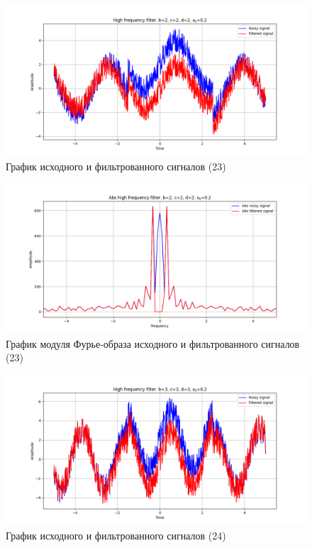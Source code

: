 \documentclass[a4paper, 12pt]{article}
\begin{document}
    \begin{figure}[!htb]
        \centering
        \includegraphics[scale=0.48]{23_u_flt_u_nolow.png}
        \captionsetup{skip=0pt}
        \caption{График исходного и фильтрованного сигналов (23)}
        \label{fig:fig_c}
    \end{figure}
    \begin{figure}[!htb]
        \centering
        \includegraphics[scale=0.48]{23_abs_u_U_nolow.png}
        \captionsetup{skip=0pt}
        \caption{График модуля Фурье-образа исходного и фильтрованного сигналов (23)}
        \label{fig:fig_d}
    \end{figure}
    \begin{figure}[!htb]
        \centering
        \includegraphics[scale=0.48]{24_u_flt_u_nolow.png}
        \captionsetup{skip=0pt}
        \caption{График исходного и фильтрованного сигналов (24)}
        \label{fig:fig_e}
    \end{figure}
\end{document}

